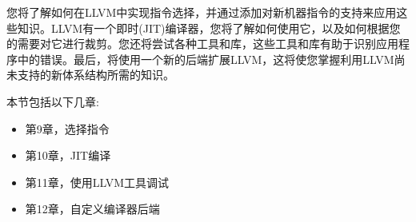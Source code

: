 您将了解如何在LLVM中实现指令选择，并通过添加对新机器指令的支持来应用这些知识。LLVM有一个即时(JIT)编译器，您将了解如何使用它，以及如何根据您的需要对它进行裁剪。您还将尝试各种工具和库，这些工具和库有助于识别应用程序中的错误。最后，将使用一个新的后端扩展LLVM，这将使您掌握利用LLVM尚未支持的新体系结构所需的知识。 \par

本节包括以下几章:\par

\begin{itemize}
\item 第9章，选择指令
\item 第10章，JIT编译
\item 第11章，使用LLVM工具调试
\item 第12章，自定义编译器后端
\end{itemize}

\newpage